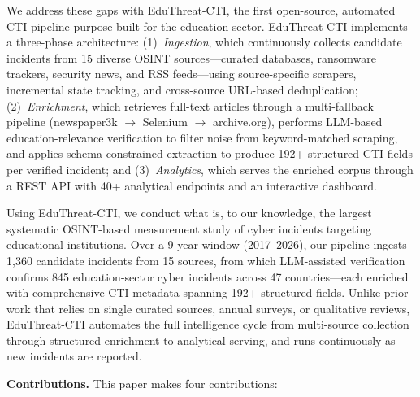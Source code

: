 \documentclass[sigconf,anonymous]{acmart}
\newcommand{\sys}{EduThreat-CTI\xspace}
\newcommand{\rawcollected}{1{,}360\xspace}       %
\newcommand{\numincidents}{845\xspace}            %
\newcommand{\numcountries}{47\xspace}
\newcommand{\numsources}{15\xspace}
\begin{document}
We address these gaps with \sys, the first open-source, automated CTI pipeline purpose-built for the education sector. \sys implements a three-phase architecture: (1)~\textit{Ingestion}, which continuously collects candidate incidents from \numsources diverse OSINT sources---curated databases, ransomware trackers, security news, and RSS feeds---using source-specific scrapers, incremental state tracking, and cross-source URL-based deduplication; (2)~\textit{Enrichment}, which retrieves full-text articles through a multi-fallback pipeline (newspaper3k $\rightarrow$ Selenium $\rightarrow$ archive.org), performs LLM-based education-relevance verification to filter noise from keyword-matched scraping, and applies schema-constrained extraction to produce 192+ structured CTI fields per verified incident; and (3)~\textit{Analytics}, which serves the enriched corpus through a REST API with 40+ analytical endpoints and an interactive dashboard.

Using \sys, we conduct what is, to our knowledge, the largest systematic OSINT-based measurement study of cyber incidents targeting educational institutions. Over a 9-year window (2017--2026), our pipeline ingests \rawcollected candidate incidents from \numsources sources, from which LLM-assisted verification confirms \numincidents education-sector cyber incidents across \numcountries countries---each enriched with comprehensive CTI metadata spanning 192+ structured fields. Unlike prior work that relies on single curated sources, annual surveys, or qualitative reviews, \sys automates the full intelligence cycle from multi-source collection through structured enrichment to analytical serving, and runs continuously as new incidents are reported.

\smallskip
\noindent\textbf{Contributions.} This paper makes four contributions:
\end{document}
